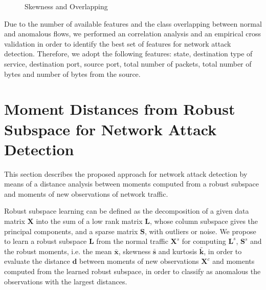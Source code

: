 \begin{figure}[!htb]
	\centering
	\caption[Skewness and Overlapping]{Skewness and Overlapping}
	\label{fig:4.10}
\end{figure}

Due to the number of available features and the class overlapping between normal and anomalous flows, we performed an correlation analysis and an empirical cross validation in order to identify the best set of features for network attack detection. Therefore, we adopt the following features: state, destination type of service, destination port, source port, total number of packets, total number of bytes and number of bytes from the source.


\section{Moment Distances from Robust Subspace for Network Attack Detection}
\label{sec:4_proposal}

This section describes the proposed approach for network attack detection by means of a distance analysis between moments computed from a robust subspace and moments of new observations of network traffic. 

Robust subspace learning can be defined as the decomposition of a given data matrix $\pmb{X}$ into the sum of a low rank matrix $\pmb{L}$, whose column subspace gives the principal components, and a sparse matrix $\pmb{S}$, with outliers or noise. We propose to learn a robust subspace $\pmb{L}$ from the normal traffic $\pmb{X}^s$ for computing $\pmb{L}^s$, $\pmb{S}^s$ and the robust moments, i.e. the mean $\bar{\pmb{x}}$, skewness $\bar{\pmb{s}}$ and kurtosis $\bar{\pmb{k}}$, in order to evaluate the distance $\pmb{d}$ between moments of new observations $\pmb{X}^c$ and moments computed from the learned robust subspace, in order to classify as anomalous the observations with the largest distances.

